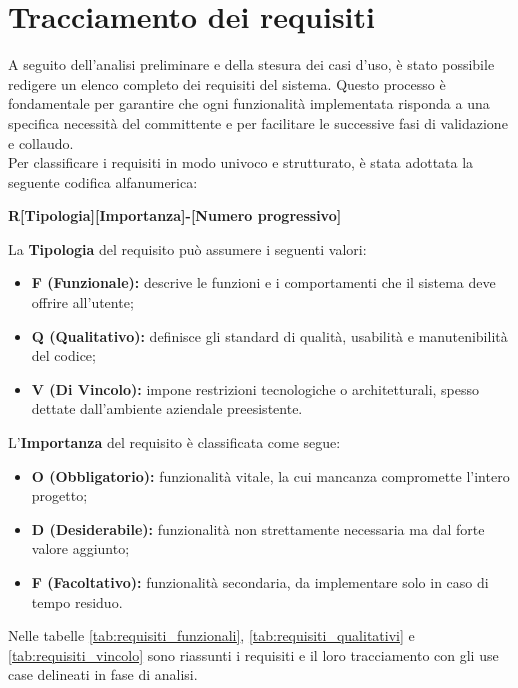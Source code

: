 \section{Tracciamento dei requisiti}
\noindent A seguito dell'analisi preliminare e della stesura dei casi d'uso, è stato possibile redigere un elenco completo dei requisiti del sistema. Questo processo è fondamentale per garantire che ogni funzionalità implementata risponda a una specifica necessità del committente e per facilitare le successive fasi di validazione e collaudo. \\
Per classificare i requisiti in modo univoco e strutturato, è stata adottata la seguente codifica alfanumerica:
\begin{center}
    \textbf{R[Tipologia][Importanza]-[Numero progressivo]}
\end{center}
\noindent La \textbf{Tipologia} del requisito può assumere i seguenti valori:
\begin{itemize}
    \item \textbf{F (Funzionale):} descrive le funzioni e i comportamenti che il sistema deve offrire all'utente;
    \item \textbf{Q (Qualitativo):} definisce gli standard di qualità, usabilità e manutenibilità del codice;
    \item \textbf{V (Di Vincolo):} impone restrizioni tecnologiche o architetturali, spesso dettate dall'ambiente aziendale preesistente.
\end{itemize}

\noindent L'\textbf{Importanza} del requisito è classificata come segue:
\begin{itemize}
    \item \textbf{O (Obbligatorio):} funzionalità vitale, la cui mancanza compromette l'intero progetto;
    \item \textbf{D (Desiderabile):} funzionalità non strettamente necessaria ma dal forte valore aggiunto;
    \item \textbf{F (Facoltativo):} funzionalità secondaria, da implementare solo in caso di tempo residuo.
\end{itemize}

\noindent Nelle tabelle \ref{tab:requisiti_funzionali}, \ref{tab:requisiti_qualitativi} e \ref{tab:requisiti_vincolo} sono riassunti i requisiti e il loro tracciamento con gli use case delineati in fase di analisi.

